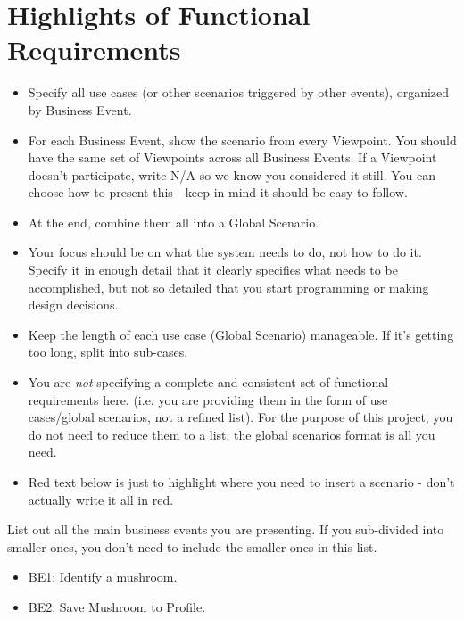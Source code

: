 \documentclass[]{article}
\begin{document}
\section{Highlights of Functional Requirements}
\label{sec:functional_requirements}
\begin{itemize}
	\item Specify all use cases (or other scenarios triggered by other events), organized by Business Event. 
	\item For each Business Event, show the scenario from every Viewpoint. You should have the same set of Viewpoints across all Business Events. If a Viewpoint doesn't participate, write N/A so we know you considered it still. You can choose how to present this - keep in mind it should be easy to follow. 
	\item At the end, combine them all into a Global Scenario.
	\item Your focus should be on what the system needs to do, not how to do it. Specify it in enough detail that it clearly specifies what needs to be accomplished, but not so detailed that you start programming or making design decisions.
	\item Keep the length of each use case (Global Scenario) manageable. If it's getting too long, split into sub-cases.
	\item You are \emph{not} specifying a complete and consistent set of functional requirements here. (i.e. you are providing them in the form of use cases/global scenarios, not a refined list). For the purpose of this project, you do not need to reduce them to a list; the global scenarios format is all you need.
	\item Red text below is just to highlight where you need to insert a scenario - don't actually write it all in red.
\end{itemize}

 List out all the main business events you are presenting. If you sub-divided into smaller ones, you don't need to include the smaller ones in this list.\\

\begin{itemize}
	\item BE1: Identify a mushroom.
 	\item BE2. Save Mushroom to Profile.
\end{itemize}
\end{document}
